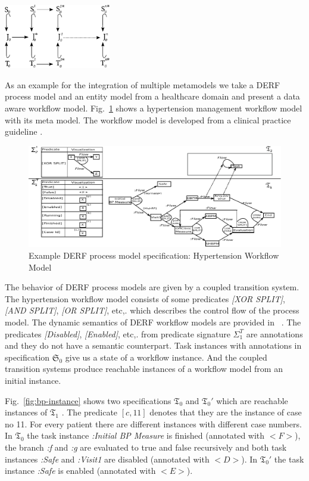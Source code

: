 \documentclass{eceasst}
\begin{document}
\begin{center}
\includegraphics[width=0.35\textwidth]{fixpoint.pdf}
\end{center}

As an example for the integration of multiple metamodels we take a DERF process model and an entity model from a healthcare domain and present a data aware workflow model.
Fig.~\ref{fig:bp} shows a hypertension management workflow model with its meta model. The workflow model is developed from a clinical practice guideline \cite{HTN}. 


\begin{figure}[h]
\centering
 \includegraphics[width=\textwidth]{bp.pdf}
 \caption{Example DERF process model specification: Hypertension Workflow Model}
 \label{fig:bp}
 \end{figure}
 
The behavior of DERF process models are given by a coupled transition system. 
The hypertension workflow model consists of some predicates \textit{[XOR SPLIT]}, \textit{[AND SPLIT]}, \textit{[OR SPLIT]}, etc,. which describes the control flow of the process model. 
The dynamic semantics of DERF workflow models are provided in ~\cite{RutleMacCaullEtAl2012ECMFA}. 
The predicates \textit{[Disabled]}, \textit{[Enabled]}, etc,. from predicate signature $\Sigma_1^T$ are annotations and they do not have a semantic counterpart. 
Task instances with annotations in specification $\mathfrak{S}_0$ give us a state of a workflow instance. 
And the coupled transition systems produce reachable instances of a workflow model from an initial instance. 


Fig.~\ref{fig:bp-instance} shows two specifications $\mathfrak{T}_0$ and $\mathfrak{T}_0'$ which are reachable instances of $\mathfrak{T}_1$ . 
The predicate $[c,11]$ denotes that they are the instance of case no 11. For every patient there are different instances with different case numbers. 
In $\mathfrak{T}_0$ the task instance \textit{:Initial BP Measure} is finished (annotated with $<F>$), the branch \textit{:f} and \textit{:g} are evaluated to true and false recursively and both task instances 
\textit{:Safe} and \textit{:Visit1} are disabled (annotated with $<D>$). 
In $\mathfrak{T}_0′$ the task instance \textit{:Safe} is enabled (annotated with $<E>$).
\end{document}
